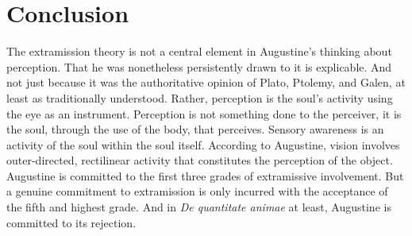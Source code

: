 \documentclass[12pt]{article}
\begin{document}


\section{Conclusion} %
\label{sec:conclusion}

The extramission theory is not a central element in Augustine’s thinking about perception. That he was nonetheless persistently drawn to it is explicable. And not just because it was the authoritative opinion of Plato, Ptolemy, and Galen, at least as traditionally understood. Rather, perception is the soul’s activity using the eye as an instrument. Perception is not something done to the perceiver, it is the soul, through the use of the body, that perceives. Sensory awareness is an activity of the soul within the soul itself. According to Augustine, vision involves outer-directed, rectilinear activity that constitutes the perception of the object. Augustine is committed to the first three grades of extramissive involvement. But a genuine commitment to extramission is only incurred with the acceptance of the fifth and highest grade. And in \emph{De quantitate animae} at least, Augustine is committed to its rejection.






\nocite{Tourscher:1933rw}
\nocite{Dodds:1963ul}
\nocite{Migne:1845aa}
\nocite{Migne:1856aa}
\nocite{Lacy:1980mk}
\nocite{Castellote:1978qe}
\nocite{Sorabji:1997ly}
\nocite{Guagliardo:1996aa}
\nocite{Wright:1981zr}
\nocite{Inwood:2001ve}



\end{document}
